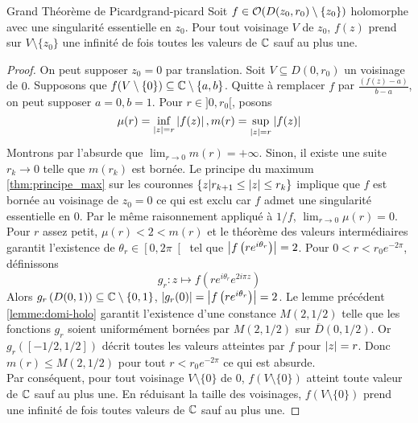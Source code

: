 \documentclass{cours}
\begin{document}
\begin{théorème}
	{Grand Théorème de Picard}{grand-picard}
	Soit $f \in \mathcal{O}(D(z_{0}, r_{0})\setminus \{z_{0}\})$ holomorphe avec une singularité essentielle en $z_{0}$. 
	Pour tout voisinage $V$ de $z_{0}$, $f(z)$ prend sur $V \setminus \{z_{0}\}$ une infinité de fois toutes les valeurs de $\mathbb{C}$ sauf au plus une. 
\end{théorème}
\begin{proof}
	On peut supposer $z_{0} = 0$ par translation. Soit $V \subseteq D(0, r_{0})$ un voisinage de $0$. 
	Supposons que $f(V \setminus \{0\}) \subseteq \mathbb{C} \setminus \{a, b\}$. 
	Quitte à remplacer $f$ par $\frac{\left(f(z) - a\right)}{b - a}$, on peut supposer $a = 0, b = 1$. 
	Pour $r \in ]0, r_{0}[$, posons
		\begin{equation*}
			\mu(r) = \inf_{\left|z\right| = r}\left|f(z)\right|, m(r) = \sup_{\left|z\right| = r}\left|f(z)\right|
		\end{equation*}
	Montrons par l'absurde que $\lim_{r \to 0} m(r) = +\infty$.
	Sinon, il existe une suite $r_{k} \to 0$ telle que $m(r_{k})$ est bornée. 
	Le principe du maximum \ref{thm:principe_max} sur les couronnes $\left\{z \middle| r_{k + 1} \leq \left|z\right|\leq r_{k}\right\}$ implique que $f$ est bornée au voisinage de $z_{0} = 0$ ce qui est exclu car $f$ admet une singularité essentielle en $0$.
	Par le même raisonnement appliqué à $1/f$, $\lim_{r \to 0} \mu(r) = 0$.\\
	Pour $r$ assez petit, $\mu(r) < 2 < m(r)$ et le théorème des valeurs intermédiaires garantit l'existence de $\theta_{r} \in \left[0, 2\pi\right[$ tel que $\left|f\left(re^{i\theta_{r}}\right)\right| = 2$.
	Pour $0 < r < r_{0}e^{-2\pi}$, définissons 
\begin{equation*}
	g_{r}: z \longmapsto f\left(re^{i\theta_{r}}e^{2i\pi z}\right)
\end{equation*}
	Alors $g_{r}\left(D(0, 1)\right) \subseteq \mathbb{C}\setminus \{0, 1\}$, $\left|g_{r}(0)\right| = \left|f\left(re^{i\theta_{r}}\right)\right| = 2$. 
	Le lemme précédent \ref{lemme:domi-holo} garantit l'existence d'une constance $M(2, 1/2)$ telle que les fonctions $g_{r}$ soient uniformément bornées par $M(2, 1/2)$ sur $\overline{D}(0, 1/2)$. 
	Or $g_{r}\left(\left[-1/2, 1/2\right]\right)$ décrit toutes les valeurs atteintes par $f$ pour $\left|z\right| = r$.
	Donc $m(r) \leq M(2, 1/2)$ pour tout $r < r_{0}e^{-2\pi}$ ce qui est absurde.\\
	Par conséquent, pour tout voisinage $V \setminus \{0\}$ de $0$, $f(V \setminus \{0\})$ atteint toute valeur de $\mathbb{C}$ sauf au plus une. 
	En réduisant la taille des voisinages, $f(V \setminus \{0\})$ prend une infinité de fois toutes valeurs de $\mathbb{C}$ sauf au plus une. 
\end{proof}
\end{document}
